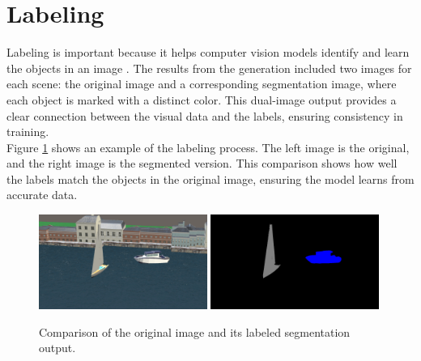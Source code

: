 \section{Labeling}
Labeling is important because it helps computer vision models identify and learn the objects in an image \cite{Labelling}.  The results from the generation included two images for each scene: the original image and a corresponding segmentation image, where each object is marked with a distinct color. This dual-image output provides a clear connection between the visual data and the labels, ensuring consistency in training.\\

\noindent Figure \ref{fig:labeled_images} shows an example of the labeling process. The left image is the original, and the right image is the segmented version. This comparison shows how well the labels match the objects in the original image, ensuring the model learns from accurate data.

\begin{figure}[H]
\centering
\includegraphics[width=0.49\textwidth]{Figures/rgb_2.png}
\includegraphics[width=0.49\textwidth]{Figures/segmentation_2.png}
\caption{Comparison of the original image and its labeled segmentation output.}
\label{fig:labeled_images}
\end{figure}

